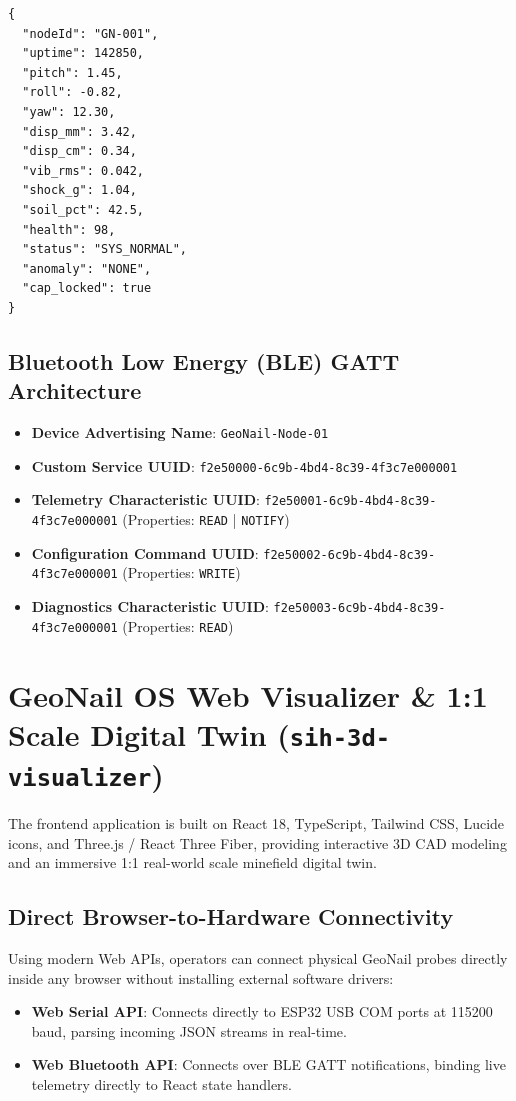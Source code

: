 \documentclass[11pt,a4paper]{article}
\begin{document}
\begin{lstlisting}[caption=Sample Live Telemetry JSON Stream Packet]
{
  "nodeId": "GN-001",
  "uptime": 142850,
  "pitch": 1.45,
  "roll": -0.82,
  "yaw": 12.30,
  "disp_mm": 3.42,
  "disp_cm": 0.34,
  "vib_rms": 0.042,
  "shock_g": 1.04,
  "soil_pct": 42.5,
  "health": 98,
  "status": "SYS_NORMAL",
  "anomaly": "NONE",
  "cap_locked": true
}
\end{lstlisting}

\subsection{Bluetooth Low Energy (BLE) GATT Architecture}
\begin{itemize}[leftmargin=*]
    \item \textbf{Device Advertising Name}: \texttt{GeoNail-Node-01}
    \item \textbf{Custom Service UUID}: \texttt{f2e50000-6c9b-4bd4-8c39-4f3c7e000001}
    \item \textbf{Telemetry Characteristic UUID}: \texttt{f2e50001-6c9b-4bd4-8c39-4f3c7e000001} (Properties: \texttt{READ} | \texttt{NOTIFY})
    \item \textbf{Configuration Command UUID}: \texttt{f2e50002-6c9b-4bd4-8c39-4f3c7e000001} (Properties: \texttt{WRITE})
    \item \textbf{Diagnostics Characteristic UUID}: \texttt{f2e50003-6c9b-4bd4-8c39-4f3c7e000001} (Properties: \texttt{READ})
\end{itemize}

\section{GeoNail OS Web Visualizer \& 1:1 Scale Digital Twin (\texttt{sih-3d-visualizer})}

The frontend application is built on React 18, TypeScript, Tailwind CSS, Lucide icons, and Three.js / React Three Fiber, providing interactive 3D CAD modeling and an immersive 1:1 real-world scale minefield digital twin.

\subsection{Direct Browser-to-Hardware Connectivity}
Using modern Web APIs, operators can connect physical GeoNail probes directly inside any browser without installing external software drivers:
\begin{itemize}[leftmargin=*]
    \item \textbf{Web Serial API}: Connects directly to ESP32 USB COM ports at 115200 baud, parsing incoming JSON streams in real-time.
    \item \textbf{Web Bluetooth API}: Connects over BLE GATT notifications, binding live telemetry directly to React state handlers.
\end{itemize}
\end{document}
